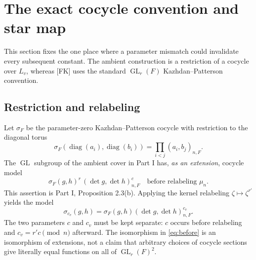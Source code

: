 \documentclass[11pt]{article}
\newcommand{\GL}{\operatorname{GL}}
\theoremstyle{plain}
\theoremstyle{definition}
\begin{document}
\section{The exact cocycle convention and star map}\label{sec:cocycle}
This section fixes the one place where a parameter mismatch could
invalidate every subsequent constant.  The ambient construction is
a restriction of a cocycle over $L_v$, whereas [FK] uses the standard
$\GL_r(F)$ Kazhdan--Patterson convention.

\subsection{Restriction and relabeling}
Let $\sigma_F$ be the parameter-zero Kazhdan--Patterson cocycle with
restriction to the diagonal torus
\begin{equation}\label{eq:parameterzero}
\sigma_F(\operatorname{diag}(a_i),\operatorname{diag}(b_i))
=\prod_{i<j}(a_i,b_j)_{n,F}.
\end{equation}
The $\GL$ subgroup of the ambient cover in Part I has, \emph{as an
extension}, cocycle model
\begin{equation}\label{eq:before}
  \sigma_F(g,h)^r\,(\det g,\det h)_{n,F}^{c}
  \quad\text{before relabeling }\mu_n.
\end{equation}
This assertion is Part I, Proposition 2.3(b).  Applying the
kernel relabeling $\zeta\mapsto\zeta^{r'}$ yields the model
\begin{equation}\label{eq:after}
 \sigma_{c_v}(g,h)=\sigma_F(g,h)
 (\det g,\det h)_{n,F}^{c_v}.
\end{equation}
The two parameters $c$ and $c_v$ must be kept separate: $c$
occurs before relabeling and $c_v=r'c\pmod n$ afterward.
The isomorphism in \eqref{eq:before} is an isomorphism of extensions,
not a claim that arbitrary choices of cocycle sections give
literally equal functions on all of $\GL_r(F)^2$.
\end{document}
